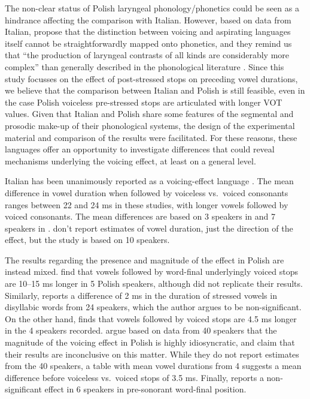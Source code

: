 \documentclass[charis]{glossa}
\begin{document}
The non-clear status of Polish laryngeal phonology/phonetics could be
seen as a hindrance affecting the comparison with Italian. However,
based on data from Italian, \citet{kirby2016a} propose that the
distinction between voicing and aspirating languages itself
\citep{beckman2013} cannot be straightforwardly mapped onto phonetics,
and they remind us that ``the production of laryngeal contrasts of all
kinds are considerably more complex'' than generally described in the
phonological literature \citep[2409]{kirby2016a}. Since this study
focusses on the effect of post-stressed stops on preceding vowel
durations, we believe that the comparison between Italian and Polish is
still feasible, even in the case Polish voiceless pre-stressed stops are
articulated with longer VOT values. Given that Italian and Polish share
some features of the segmental and prosodic make-up of their
phonological systems, the design of the experimental material and
comparison of the results were facilitated. For these reasons, these
languages offer an opportunity to investigate differences that could
reveal mechanisms underlying the voicing effect, at least on a general
level.

Italian has been unanimously reported as a voicing-effect language
\citep{caldognetto1979, farnetani1986, esposito2002}. The mean
difference in vowel duration when followed by voiceless vs.~voiced
consonants ranges between 22 and 24 ms in these studies, with longer
vowels followed by voiced consonants. The mean differences are based on
3 speakers in \citet{farnetani1986} and 7 speakers in
\citet{esposito2002}. \citet{caldognetto1979} don't report estimates of
vowel duration, just the direction of the effect, but the study is based
on 10 speakers.

The results regarding the presence and magnitude of the effect in Polish
are instead mixed. \citet{slowiaczek1985} find that vowels followed by
word-final underlyingly voiced stops are 10--15 ms longer in 5 Polish
speakers, although \citet{jassem1989} did not replicate their results.
Similarly, \citet{keating1984} reports a difference of 2 ms in the
duration of stressed vowels in disyllabic words from 24 speakers, which
the author argues to be non-significant. On the other hand,
\citet{nowak2006} finds that vowels followed by voiced stops are 4.5 ms
longer in the 4 speakers recorded. \citet{malisz2008} argue based on
data from 40 speakers that the magnitude of the voicing effect in Polish
is highly idiosyncratic, and claim that their results are inconclusive
on this matter. While they do not report estimates from the 40 speakers,
a table with mean vowel durations from 4 suggests a mean difference
before voiceless vs.~voiced stops of 3.5 ms. Finally,
\citet{strycharczuk2012a} reports a non-significant effect in 6 speakers
in pre-sonorant word-final position.
\end{document}
